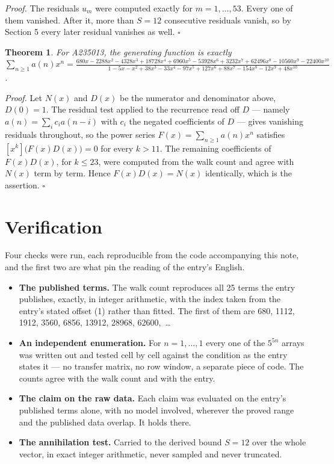 \documentclass[11pt]{article}
\newtheorem{theorem}{Theorem}
\theoremstyle{definition}
\begin{document}
{\itshape Proof.} The residuals $u_m$ were computed exactly for $m = 1,\dots,53$. Every one of them vanished. After it, more than $S = 12$ consecutive residuals vanish, so by Section 5 every later residual vanishes as well. $\square$

\begin{theorem} For A235013, the generating function is exactly $\sum_{n\ge 1} a(n)x^n = \frac{680x - 2288x^{2} - 4328x^{3} + 18728x^{4} + 6960x^{5} - 53928x^{6} + 3232x^{7} + 62496x^{8} - 10560x^{9} - 22400x^{10}}{1 - 5x - x^{2} + 38x^{3} - 33x^{4} - 97x^{5} + 127x^{6} + 88x^{7} - 154x^{8} - 12x^{9} + 48x^{10}}$.\end{theorem}

{\itshape Proof.} Let $N(x)$ and $D(x)$ be the numerator and denominator above, $D(0)=1$. The residual test applied to the recurrence read off $D$ --- namely $a(n) = \sum_i c_i a(n-i)$ with $c_i$ the negated coefficients of $D$ --- gives vanishing residuals throughout, so the power series $F(x)=\sum_{n\ge 1}a(n)x^n$ satisfies $[x^k]\bigl(F(x)D(x)\bigr) = 0$ for every $k > 11$. The remaining coefficients of $F(x)D(x)$, for $k \le 23$, were computed from the walk count and agree with $N(x)$ term by term. Hence $F(x)D(x) = N(x)$ identically, which is the assertion. $\square$

\section{Verification}

Four checks were run, each reproducible from the code accompanying this note, and the first two are what pin the reading of the entry's English.

\begin{itemize}

\item {\bfseries The published terms.} The walk count reproduces all 25 terms the entry publishes, exactly, in integer arithmetic, with the index taken from the entry's stated offset (1) rather than fitted. The first of them are 680, 1112, 1912, 3560, 6856, 13912, 28968, 62600,~\dots

\item {\bfseries An independent enumeration.} For $n = 1,\dots,1$ every one of the $5^{5n}$ arrays was written out and tested cell by cell against the condition as the entry states it --- no transfer matrix, no row window, a separate piece of code. The counts agree with the walk count and with the entry.

\item {\bfseries The claim on the raw data.} Each claim was evaluated on the entry's published terms alone, with no model involved, wherever the proved range and the published data overlap. It holds there.

\item {\bfseries The annihilation test.} Carried to the derived bound $S = 12$ over the whole vector, in exact integer arithmetic, never sampled and never truncated.

\end{itemize}
\end{document}
